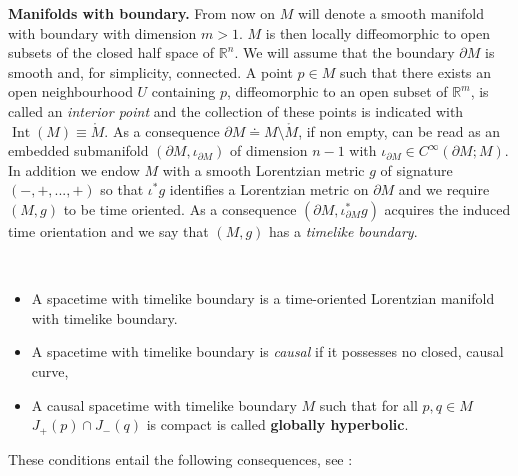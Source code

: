 \noindent\textbf{Manifolds with boundary.} From now on $M$ will denote a smooth manifold with boundary with dimension $m>1$. $M$ is then locally diffeomorphic to open subsets of the closed half space of $\mathbb{R}^n$. We will assume that the boundary $\partial M$ is smooth and, for simplicity, connected. A point $p\in M$ such that there exists an open neighbourhood $U$ containing $p$, diffeomorphic to an open subset of $\mathbb{R}^m$, is called an {\em interior point} and the collection of these points is indicated with $\operatorname{Int}(M)\equiv\mathring{M}$. As a consequence $\partial M\doteq M\setminus\mathring{M}$, if non empty, can be read as an embedded submanifold $(\partial M,\iota_{\partial M})$ of dimension $n-1$ with $\iota_{\partial M}\in C^\infty(\partial M; M)$.\\
In addition we endow $M$ with a smooth Lorentzian metric $g$ of signature $(-,+,...,+)$ so that $\iota^*g$ identifies a Lorentzian metric on $\partial M$ and we require $(M,g)$ to be time oriented. As a consequence $(\partial M,\iota^*_{\partial M}g)$ acquires the induced time orientation and we say that $(M,g)$ has a {\em timelike boundary}. 

\begin{Definition}\label{Def: spacetime timelike boundary}\hfill\\
	\vspace{-0.6cm}
	\begin{itemize}
	\item A spacetime with timelike boundary is a time-oriented Lorentzian manifold with timelike boundary.
	\item A spacetime with timelike boundary is {\em causal} if it possesses no closed, causal curve,
	\item A causal spacetime with timelike boundary $M$ such that for all $p,q\in M$ $J_+(p)\cap J_-(q)$ is compact is called \textbf{globally hyperbolic}.
	\end{itemize}
\end{Definition}

These conditions entail the following consequences, see \cite[Th. 1.1 \& 3.14]{Ake-Flores-Sanchez-18}:

